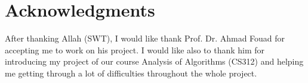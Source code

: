 \chapter*{Acknowledgments}
\label{chap:ack}
After thanking Allah (SWT), I would like thank Prof. Dr. Ahmad Fouad for accepting me to work on his project. I would like also to thank him for introducing my project of our course Analysis of Algorithms (CS312) and helping me getting through a lot of difficulties throughout the whole project.
